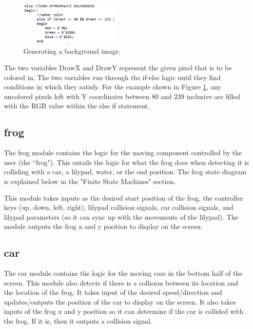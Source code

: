 \documentclass[journal, twocolumn, final,11pt,letterpaper]{IEEEtran}
\begin{document}
	\begin{figure}[H]
		\centering
		\includegraphics[width=0.45\textwidth]{background_ex.png}
		\caption{Generating a background image.}
		\label{fig:background_ex}
	\end{figure}
	
	The two variables DrawX and DrawY represent the given pixel that is to be colored in.  The two variables run through the if-else logic until they find conditions in which they satisfy.  For the example shown in Figure \ref{fig:background_ex}, any uncolored pixels left with Y coordinates between 80 and 239 inclusive are filled with the RGB value within the else if statement.  
	
	
	
	\subsection{frog}
	The frog module contains the logic for the moving component controlled by the user (the ``frog"). This entails the logic for what the frog does when detecting it is colliding with a car, a lilypad, water, or the end position. The frog state diagram is explained below in the "Finite State Machines" section. 
	
	This module takes inputs as the desired start position of the frog, the controller keys (up, down, left, right), lilypad collision signals, car collision signals, and lilypad parameters (so it can sync up with the movements of the lilypad). The module outputs the frog x and y position to display on the screen.
	
	\subsection{car}
	The car module contains the logic for the moving cars in the bottom half of the screen. This module also detects if there is a collision between its location and the location of the frog. It takes input of the desired speed/direction and updates/outputs the position of the car to display on the screen. It also takes inputs of the frog x and y position so it can determine if the car is collided with the frog. If it is, then it outputs a collision signal.
	
\end{document}
